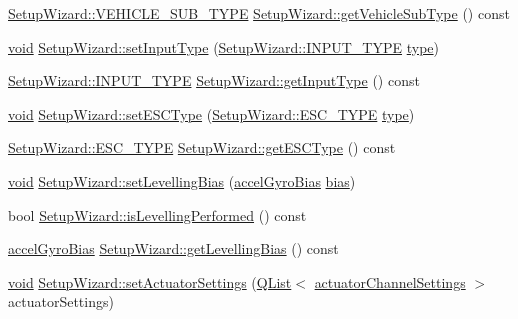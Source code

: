 \begin{DoxyCompactItemize}
\item 
\hyperlink{group___vehicle_configuration_source_gaa22bfa88d750f2b46f66702a723e8342}{Setup\-Wizard\-::\-V\-E\-H\-I\-C\-L\-E\-\_\-\-S\-U\-B\-\_\-\-T\-Y\-P\-E} \hyperlink{group___setup_ga4ad46c232d39b8e7a4371a812c48e761}{Setup\-Wizard\-::get\-Vehicle\-Sub\-Type} () const 
\item 
\hyperlink{group___u_a_v_objects_plugin_ga444cf2ff3f0ecbe028adce838d373f5c}{void} \hyperlink{group___setup_gaad34b14bbd332f721c9bca49fc43bf33}{Setup\-Wizard\-::set\-Input\-Type} (\hyperlink{group___vehicle_configuration_source_gae10edd59d3a32fad8c531a1d2346115c}{Setup\-Wizard\-::\-I\-N\-P\-U\-T\-\_\-\-T\-Y\-P\-E} \hyperlink{glext_8h_a7d05960f4f1c1b11f3177dc963a45d86}{type})
\item 
\hyperlink{group___vehicle_configuration_source_gae10edd59d3a32fad8c531a1d2346115c}{Setup\-Wizard\-::\-I\-N\-P\-U\-T\-\_\-\-T\-Y\-P\-E} \hyperlink{group___setup_ga8457ec450095eb7b93fd74be5451cac6}{Setup\-Wizard\-::get\-Input\-Type} () const 
\item 
\hyperlink{group___u_a_v_objects_plugin_ga444cf2ff3f0ecbe028adce838d373f5c}{void} \hyperlink{group___setup_ga08e01090d6c906ff75ee8d840bbd9862}{Setup\-Wizard\-::set\-E\-S\-C\-Type} (\hyperlink{group___vehicle_configuration_source_ga734c812e17554d4f7ca67f1008abdd6c}{Setup\-Wizard\-::\-E\-S\-C\-\_\-\-T\-Y\-P\-E} \hyperlink{glext_8h_a7d05960f4f1c1b11f3177dc963a45d86}{type})
\item 
\hyperlink{group___vehicle_configuration_source_ga734c812e17554d4f7ca67f1008abdd6c}{Setup\-Wizard\-::\-E\-S\-C\-\_\-\-T\-Y\-P\-E} \hyperlink{group___setup_ga3922ac6f628847018f045d0c60f1ba6b}{Setup\-Wizard\-::get\-E\-S\-C\-Type} () const 
\item 
\hyperlink{group___u_a_v_objects_plugin_ga444cf2ff3f0ecbe028adce838d373f5c}{void} \hyperlink{group___setup_ga04cbfb7730776465a95c22950d048556}{Setup\-Wizard\-::set\-Levelling\-Bias} (\hyperlink{structaccel_gyro_bias}{accel\-Gyro\-Bias} \hyperlink{glext_8h_a39c3ffa18f420251c5d132dd8c1c6137}{bias})
\item 
bool \hyperlink{group___setup_ga71069ce8994f32f192e40aaa45b51a4a}{Setup\-Wizard\-::is\-Levelling\-Performed} () const 
\item 
\hyperlink{structaccel_gyro_bias}{accel\-Gyro\-Bias} \hyperlink{group___setup_ga2e280373fdc65c0cb8c5520855eadbef}{Setup\-Wizard\-::get\-Levelling\-Bias} () const 
\item 
\hyperlink{group___u_a_v_objects_plugin_ga444cf2ff3f0ecbe028adce838d373f5c}{void} \hyperlink{group___setup_gadf481b176ca83f64ec53b8479220abec}{Setup\-Wizard\-::set\-Actuator\-Settings} (\hyperlink{class_q_list}{Q\-List}$<$ \hyperlink{structactuator_channel_settings}{actuator\-Channel\-Settings} $>$ actuator\-Settings)

\end{DoxyCompactItemize}
